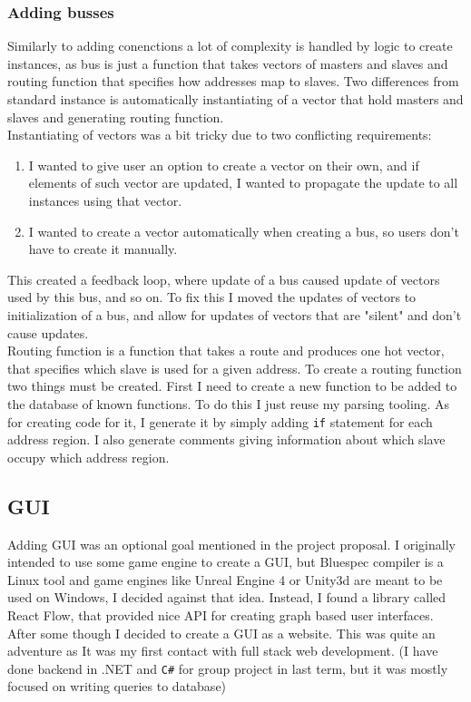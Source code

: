 \documentclass[14pt]{report}
\begin{document}
\subsubsection{Adding busses}
Similarly to adding conenctions a lot of complexity is handled by logic to create instances, as bus is just a function that takes vectors of masters and slaves and routing function that specifies how addresses map to slaves. Two differences from standard instance is automatically instantiating of a vector that hold masters and slaves and generating routing function. \\
Instantiating of vectors was a bit tricky due to two conflicting requirements:
\begin{enumerate}
    \item I wanted to give user an option to create a vector on their own, and if elements of such vector are updated, I wanted to propagate the update to all instances using that vector.
    \item I wanted to create a vector automatically when creating a bus, so users don't have to create it manually.
\end{enumerate} 
This created a feedback loop, where update of a bus caused update of vectors used by this bus, and so on. To fix this I moved the updates of vectors to initialization of a bus, and allow for updates of vectors that are "silent" and don't cause updates. 
\\
Routing function is a function that takes a route and produces one hot vector, that specifies which slave is used for a given address. 
To create a routing function two things must be created. First I need to create a new function to be added to the database of known functions. To do this I just reuse my parsing tooling. As for creating code for it, I generate it by simply adding \verb!if! statement for each address region. I also generate comments giving information about which slave occupy which address region.

\subsection{GUI}
Adding GUI was an optional goal mentioned in the project proposal. I originally intended to use some game engine to create a GUI, but Bluespec compiler is a Linux tool and game engines like Unreal Engine 4 or Unity3d are meant to be used on Windows, I decided against that idea. Instead, I found a library called React Flow, that provided nice API for creating graph based user interfaces. After some though I decided to create a GUI as a website. This was quite an adventure as It was my first contact with full stack web development. (I have done backend in .NET and \verb!C#! for group project in last term, but it was mostly focused on writing queries to database)
\end{document}
